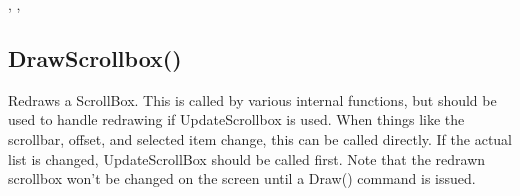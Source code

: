 \documentclass[letterpaper,10pt,english]{sphinxmanual}
\begin{document}
\sphinxAtStartPar
{}

\sphinxAtStartPar
{}, , 

\ignorespaces 

\subsection{DrawScrollbox()}
\label{\detokenize{reference/ui:drawscrollbox}}\label{\detokenize{reference/ui:index-6}}
\sphinxAtStartPar
{}

\sphinxAtStartPar
{}

\sphinxAtStartPar
Redraws a ScrollBox. This is called by various internal functions, but should be used to handle redrawing if UpdateScrollbox is used. When things like the scrollbar, offset, and selected item change, this can be called directly. If the actual list is changed, UpdateScrollBox should be called first. Note that the redrawn scrollbox won’t be changed on the screen until a Draw() command is issued.

\sphinxAtStartPar
{}

\begin{sphinxVerbatim}[commandchars=\\\{\}]
\end{sphinxVerbatim}

\sphinxAtStartPar
{}
\end{document}
